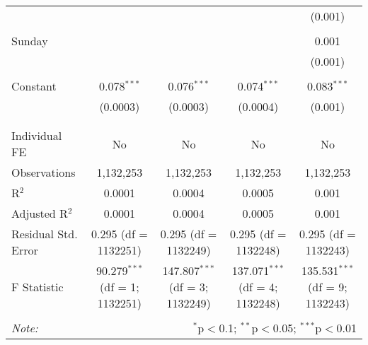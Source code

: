 \documentclass[
]{article}
\begin{document}
\begin{table}[!htbp]
{\begin{tabular}{@{\extracolsep{5pt}}lcccc}
  &  &  &  & (0.001) \\ 
  & & & & \\ 
 Sunday &  &  &  & 0.001 \\ 
  &  &  &  & (0.001) \\ 
  & & & & \\ 
 Constant & 0.078$^{***}$ & 0.076$^{***}$ & 0.074$^{***}$ & 0.083$^{***}$ \\ 
  & (0.0003) & (0.0003) & (0.0004) & (0.001) \\ 
  & & & & \\ 
\hline \\[-1.8ex] 
Individual FE & No & No & No & No \\ 
Observations & 1,132,253 & 1,132,253 & 1,132,253 & 1,132,253 \\ 
R$^{2}$ & 0.0001 & 0.0004 & 0.0005 & 0.001 \\ 
Adjusted R$^{2}$ & 0.0001 & 0.0004 & 0.0005 & 0.001 \\ 
Residual Std. Error & 0.295 (df = 1132251) & 0.295 (df = 1132249) & 0.295 (df = 1132248) & 0.295 (df = 1132243) \\ 
F Statistic & 90.279$^{***}$ (df = 1; 1132251) & 147.807$^{***}$ (df = 3; 1132249) & 137.071$^{***}$ (df = 4; 1132248) & 135.531$^{***}$ (df = 9; 1132243) \\ 
\hline 
\hline \\[-1.8ex] 
\textit{Note:}  & \multicolumn{4}{r}{$^{*}$p$<$0.1; $^{**}$p$<$0.05; $^{***}$p$<$0.01} \\ 
\end{tabular}
} 
\end{table} 
\newpage
\end{document}

